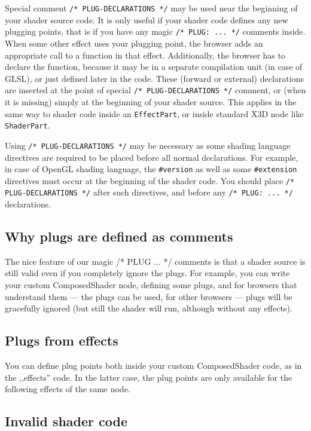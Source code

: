 \documentclass{acmsiggraph}                     %
\begin{document}
Special comment \texttt{/* PLUG-DECLARATIONS */} may be used
near the beginning of your shader source code. It is only useful
if your shader code defines any new plugging points, that is if you
have any magic \texttt{/* PLUG: ... */} comments inside.
When some other effect uses your plugging point, the browser adds
an appropriate call to a function in that effect.
Additionally, the browser has to declare the function,
because it may be in a separate compilation unit (in case of GLSL),
or just defined later in the code.
These (forward or external) declarations are inserted at
the point of special \texttt{/* PLUG-DECLARATIONS */}
comment, or (when it is missing) simply at the beginning of your shader source.
This applies in the same way to shader code inside an \texttt{EffectPart},
or inside standard X3D node like \texttt{ShaderPart}.

Using \texttt{/* PLUG-DECLARATIONS */} may be necessary
as some shading language directives are required to be placed before
all normal declarations. For example, in case of OpenGL shading language,
the \texttt{\#version} as well as some \texttt{\#extension} directives
must occur at the beginning of the shader code. You should place
\texttt{/* PLUG-DECLARATIONS */} after such directives,
and before any \texttt{/* PLUG: ... */} declarations.

\subsection{Why plugs are defined as comments}

The nice feature of our magic /* PLUG ... */ comments is that a shader source
is still valid even if you completely ignore the plugs. For example,
you can write your custom ComposedShader node, defining some plugs,
and for browsers that understand them --- the plugs can be used,
for other browsers --- plugs will be gracefully ignored (but still
the shader will run, although without any effects).

\subsection{Plugs from effects}

You can define plug points both inside your custom ComposedShader code,
as in the ,,effects'' code. In the latter case, the plug points
are only available for the following effects of the same node.

\subsection{Invalid shader code}
\end{document}
